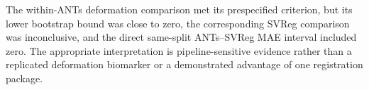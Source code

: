 \documentclass[11pt]{article}
\begin{document}
The within-ANTs deformation comparison met its prespecified criterion, but its
lower bootstrap bound was close to zero, the corresponding SVReg comparison
was inconclusive, and the direct same-split ANTs--SVReg MAE interval included
zero. The appropriate interpretation is pipeline-sensitive evidence rather
than a replicated deformation biomarker or a demonstrated advantage of one
registration package.



\end{document}
